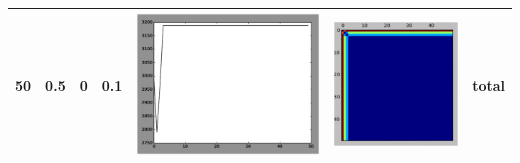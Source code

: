 \begin{table}
\begin{tabular}{@{}|l|l|l|l|l|l|l|@{}}
			50 & 0.5 & 0 & 0.1 & \includegraphics[scale=0.4]{fig/fmridti/sat1.eps}  & \includegraphics[scale=0.6]{fig/fmridti/sat1d.eps} & total \\ \midrule

\end{tabular}
\end{table}
